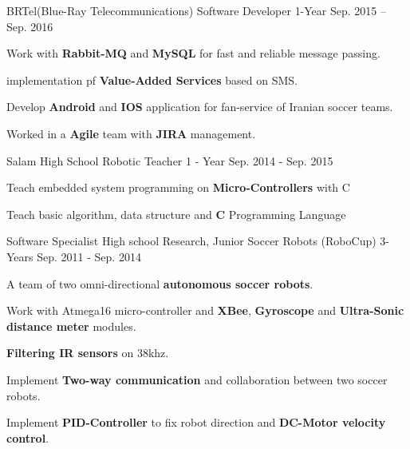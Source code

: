 \begin{cventries}
  \cventry
    {BRTel(Blue-Ray Telecommunications)} %
    {Software Developer} %
    {1-Year} %
    {Sep. 2015 -- Sep. 2016} %
    {
      \begin{cvitems} %
        \item {Work with \textbf{Rabbit-MQ} and \textbf{MySQL} for fast and reliable message passing.}
        \item {implementation pf \textbf{Value-Added Services} based on SMS.}
        \item {Develop \textbf{Android} and \textbf{IOS} application for fan-service of Iranian soccer teams.}
        \item {Worked in a \textbf{Agile} team with \textbf{JIRA} management.}
      \end{cvitems}
    }

    
  \cventry
    {Salam High School} %
    {Robotic Teacher} %
    {1 - Year} %
    {Sep. 2014 - Sep. 2015} %
    {
      \begin{cvitems} %
        \item {Teach embedded system programming on \textbf{Micro-Controllers} with C}
        \item {Teach basic algorithm, data structure and \textbf{C} Programming Language}
      \end{cvitems}
    }

  \cventry
    {Software Specialist} %
    {High school Research, Junior Soccer Robots (RoboCup)} %
    {3-Years} %
    {Sep. 2011 - Sep. 2014} %
    {
      \begin{cvitems} %
        \item {A team of two omni-directional \textbf{autonomous soccer robots}.}
        \item {Work with Atmega16 micro-controller and \textbf{XBee}, \textbf{Gyroscope} and \textbf{Ultra-Sonic distance meter} modules.}
        \item {\textbf{Filtering IR sensors} on 38khz.}
        \item {Implement \textbf{Two-way communication} and collaboration between two soccer robots.}
        \item {Implement \textbf{PID-Controller} to fix robot direction and \textbf{DC-Motor velocity control}.}
      \end{cvitems}
    }


\end{cventries}
